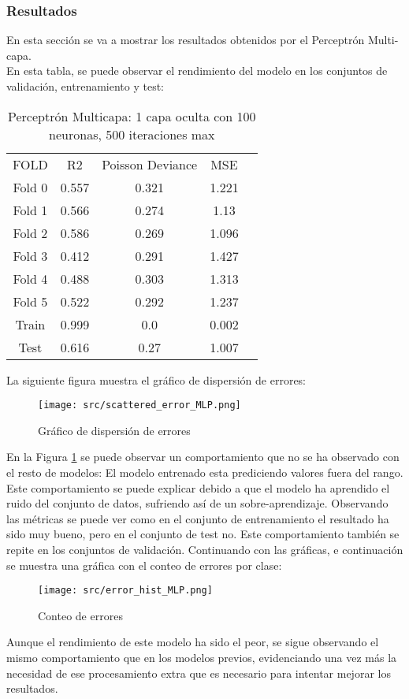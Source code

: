 \subsubsection*{Resultados}
En esta sección se va a mostrar los resultados obtenidos por el Perceptrón Multi-capa. \\
\linebreak
En esta tabla, se puede observar el rendimiento del modelo en los conjuntos de validación, entrenamiento y test:
\begin{table}[H]
	\centering
	\begin{tabular}{|c|c|c|c|c}
		\cline{1-4}
		FOLD   & R2    & Poisson Deviance & MSE   \\\cline{1-4}
		Fold 0 & 0.557 & 0.321            & 1.221 \\\cline{1-4}
		Fold 1 & 0.566 & 0.274            & 1.13  \\\cline{1-4}
		Fold 2 & 0.586 & 0.269            & 1.096 \\\cline{1-4}
		Fold 3 & 0.412 & 0.291            & 1.427 \\\cline{1-4}
		Fold 4 & 0.488 & 0.303            & 1.313 \\\cline{1-4}
		Fold 5 & 0.522 & 0.292            & 1.237 \\\cline{1-4}
		Train  & 0.999 & 0.0              & 0.002 \\\cline{1-4}
		Test   & 0.616 & 0.27             & 1.007 \\\cline{1-4}
	\end{tabular}
	\caption{Perceptrón Multicapa: 1 capa oculta con 100 neuronas, 500 iteraciones max}
	\label{tab:mlp_res}
\end{table}
\clearpage
La siguiente figura muestra el gráfico de dispersión de errores:
\begin{figure}[H]
	\centering
	\texttt{[image: src/scattered\_error\_MLP.png]}
	\caption{Gráfico de dispersión de errores}
	\label{fig:mlp_scattered}
\end{figure}
En la Figura \ref{fig:mlp_scattered} se puede observar un comportamiento que no se ha observado con el resto de modelos: El modelo entrenado esta prediciendo valores fuera del rango. Este comportamiento se puede explicar debido a que el modelo ha aprendido el ruido del conjunto de datos, sufriendo así de un sobre-aprendizaje. Observando las métricas se puede ver como en el conjunto de entrenamiento el resultado ha sido muy bueno, pero en el conjunto de test no. Este comportamiento también se repite en los conjuntos de validación.
\clearpage
Continuando con las gráficas, e continuación se muestra una gráfica con el conteo de errores por clase:
\begin{figure}[H]
	\centering	\texttt{[image: src/error\_hist\_MLP.png]}
	\caption{Conteo de errores}
	\label{fig:mlp_error_plot}
\end{figure}
Aunque el rendimiento de este modelo ha sido el peor, se sigue observando el mismo comportamiento que en los modelos previos, evidenciando una vez más la necesidad de ese procesamiento extra que es necesario para intentar mejorar los resultados.
\clearpage
